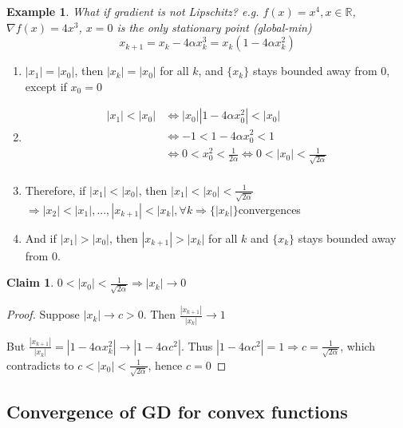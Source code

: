 \documentclass[11pt,a4paper]{article}
\newtheorem{example}{Example}
\newtheorem{claim}{Claim}
\begin{document}
\begin{example}
What if gradient is not Lipschitz? e.g. $f(x)=x^4,x\in \mathbb{R}$, $\nabla f(x)=4x^3$, $x=0$ is the only stationary point (global-min)
$$x_{k+1}=x_k-4\alpha x_k^3=x_k(1-4\alpha x_k^2)$$
\end{example}
\begin{enumerate}[$\bullet$]
    \item $|x_1|=|x_0|$, then $|x_k|=|x_0|$ for all $k$, and $\{x_k\}$ stays bounded away from $0$, except if $x_0=0$
    \item \begin{equation}
        \begin{aligned}
            |x_1|<|x_0| &\Leftrightarrow	|x_0||1-4\alpha x_0^2|<|x_0|\\
            &\Leftrightarrow -1<1-4\alpha x_0^2<1\\
            &\Leftrightarrow 0<x_0^2<\frac{1}{2\alpha} \Leftrightarrow	0<|x_0|<\frac{1}{\sqrt{2\alpha}}\\
        \end{aligned}
        \nonumber
    \end{equation}
    \item Therefore, if $|x_1|<|x_0|$, then $|x_1|<|x_0|<\frac{1}{\sqrt{2\alpha}}$ $\Rightarrow	|x_2|<|x_1|,...,|x_{k+1}|<|x_k|,\forall k \Rightarrow \{|x_k|\}$convergences
    \item And if $|x_1|>|x_0|$, then $|x_{k+1}|>|x_k|$ for all $k$ and $\{x_k\}$ stays bounded away from $0$.
\end{enumerate}
\begin{claim}
$0<|x_0|<\frac{1}{\sqrt{2\alpha}} \Rightarrow |x_k| \rightarrow	0$
\end{claim}
\begin{proof}
Suppose $|x_k| \rightarrow	c>0$. Then $\frac{|x_{k+1}|}{|x_k|} \rightarrow	1$

But $\frac{|x_{k+1}|}{|x_k|} = |1-4\alpha x_k^2| \rightarrow |1-4\alpha c^2|$. Thus $|1-4\alpha c^2|=1 \Rightarrow	c=\frac{1}{\sqrt{2\alpha}}$, which contradicts to $c<|x_0|<\frac{1}{\sqrt{2\alpha}}$, hence $c=0$

\end{proof}


\subsection{Convergence of GD for convex functions}
\end{document}
